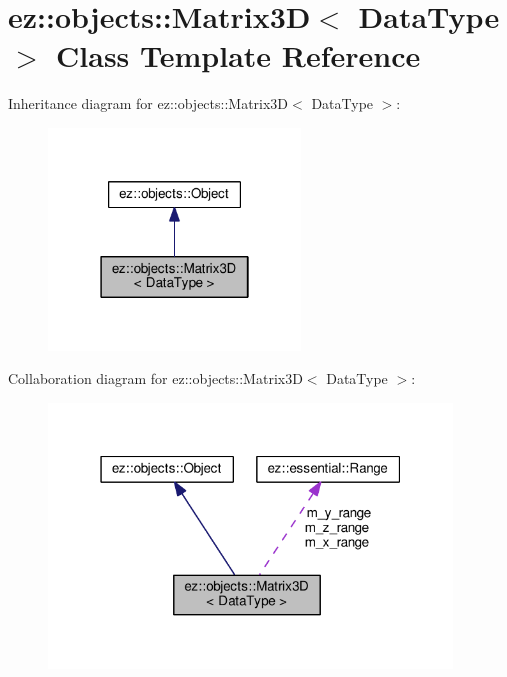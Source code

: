 \hypertarget{classez_1_1objects_1_1Matrix3D}{}\section{ez\+:\+:objects\+:\+:Matrix3D$<$ Data\+Type $>$ Class Template Reference}
\label{classez_1_1objects_1_1Matrix3D}


Inheritance diagram for ez\+:\+:objects\+:\+:Matrix3D$<$ Data\+Type $>$\+:
\nopagebreak
\begin{figure}[H]
\begin{center}
\leavevmode
\includegraphics[width=190pt]{classez_1_1objects_1_1Matrix3D__inherit__graph}
\end{center}
\end{figure}


Collaboration diagram for ez\+:\+:objects\+:\+:Matrix3D$<$ Data\+Type $>$\+:
\nopagebreak
\begin{figure}[H]
\begin{center}
\leavevmode
\includegraphics[width=304pt]{classez_1_1objects_1_1Matrix3D__coll__graph}
\end{center}
\end{figure}
